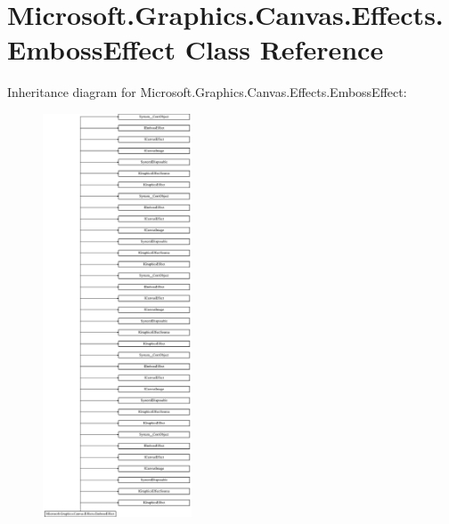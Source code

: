 \hypertarget{class_microsoft_1_1_graphics_1_1_canvas_1_1_effects_1_1_emboss_effect}{}\section{Microsoft.\+Graphics.\+Canvas.\+Effects.\+Emboss\+Effect Class Reference}
\label{class_microsoft_1_1_graphics_1_1_canvas_1_1_effects_1_1_emboss_effect}
Inheritance diagram for Microsoft.\+Graphics.\+Canvas.\+Effects.\+Emboss\+Effect\+:\begin{figure}[H]
\begin{center}
\leavevmode
\includegraphics[height=12.000000cm]{class_microsoft_1_1_graphics_1_1_canvas_1_1_effects_1_1_emboss_effect}
\end{center}
\end{figure}
